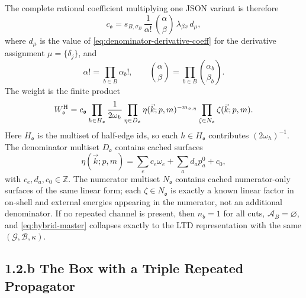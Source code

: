 \documentclass[11pt,a4paper]{report}
\newcommand{\Graph}{\mathcal G}
\newcommand{\Basis}{\mathcal B}
\newcommand{\Active}{\mathcal A}
\begin{document}
The complete rational coefficient multiplying one JSON variant is therefore
\begin{equation}
  c_{\mathfrak o}
  =
  s_{B,\sigma_B}\,
  \frac{1}{\alpha!}\,
  \binom{\alpha}{\beta}\,
  \lambda_{\beta x}\,
  d_{\mu},
  \label{eq:hybrid-coefficient}
\end{equation}
where \(d_\mu\) is the value of
\eqref{eq:denominator-derivative-coeff} for the derivative assignment
\(\mu=\{\delta_j\}\), and
\[
  \alpha!=\prod_{b\in B}\alpha_b!,\qquad
  \binom{\alpha}{\beta}=\prod_{b\in B}\binom{\alpha_b}{\beta_b}.
\]
The weight is the finite product
\begin{equation}
  W_{\mathfrak o}^{\rm H}
  =
  c_{\mathfrak o}
  \prod_{h\in H_{\mathfrak o}}\frac{1}{2\omega_h}
  \prod_{\eta\in D_{\mathfrak o}}\eta(\vec k;p,m)^{-m_{\mathfrak o,\eta}}
  \prod_{\zeta\in N_{\mathfrak o}}\zeta(\vec k;p,m) .
  \label{eq:hybrid-weight}
\end{equation}
Here \(H_{\mathfrak o}\) is the multiset of half-edge ids, so each
\(h\in H_{\mathfrak o}\) contributes \((2\omega_h)^{-1}\).  The denominator
multiset \(D_{\mathfrak o}\) contains cached surfaces
\[
  \eta(\vec k;p,m)=\sum_e c_e\omega_e+\sum_a d_a p_a^0+c_0,
\]
with \(c_e,d_a,c_0\in\mathbb Z\).  The numerator multiset
\(N_{\mathfrak o}\) contains cached numerator-only surfaces of the same
linear form; each \(\zeta\in N_{\mathfrak o}\) is exactly a known linear
factor in on-shell and external energies appearing in the numerator, not an
additional denominator.  If no repeated channel is
present, then
\(n_b=1\) for all cuts, \(\Active_B=\varnothing\), and
\eqref{eq:hybrid-master} collapses exactly to the LTD representation with the
same \((\Graph,\Basis,\kappa)\).

\subsection*{1.2.b The Box with a Triple Repeated Propagator}
\end{document}
